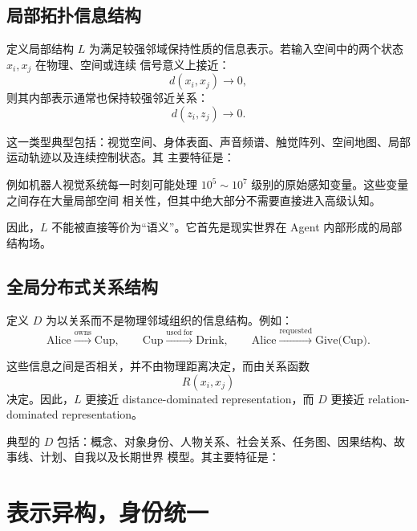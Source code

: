 \subsection{局部拓扑信息结构}

定义局部结构 $L$ 为满足较强邻域保持性质的信息表示。若输入空间中的两个状态 $x_i,x_j$ 在物理、空间或连续
信号意义上接近：
\[
d(x_i,x_j)\rightarrow0,
\]
则其内部表示通常也保持较强邻近关系：
\[
d(z_i,z_j)\rightarrow0.
\]

这一类型典型包括：视觉空间、身体表面、声音频谱、触觉阵列、空间地图、局部运动轨迹以及连续控制状态。其
主要特征是：

\begin{statementbox}
\centering
{}
\end{statementbox}

例如机器人视觉系统每一时刻可能处理 $10^5\sim10^7$ 级别的原始感知变量。这些变量之间存在大量局部空间
相关性，但其中绝大部分不需要直接进入高级认知。

因此，$L$ 不能被直接等价为“语义”。它首先是现实世界在 Agent 内部形成的局部结构场。

\subsection{全局分布式关系结构}

定义 $D$ 为以关系而不是物理邻域组织的信息结构。例如：
\[
\text{Alice}\xrightarrow{\mathrm{owns}}\text{Cup},
\qquad
\text{Cup}\xrightarrow{\mathrm{used\ for}}\text{Drink},
\qquad
\text{Alice}\xrightarrow{\mathrm{requested}}\text{Give(Cup)}.
\]

这些信息之间是否相关，并不由物理距离决定，而由关系函数
\[
R(x_i,x_j)
\]
决定。因此，$L$ 更接近 distance-dominated representation，而 $D$ 更接近 relation-dominated
representation。

典型的 $D$ 包括：概念、对象身份、人物关系、社会关系、任务图、因果结构、故事线、计划、自我以及长期世界
模型。其主要特征是：

\begin{statementbox}
\centering
{}
\end{statementbox}

\section{表示异构，身份统一}

